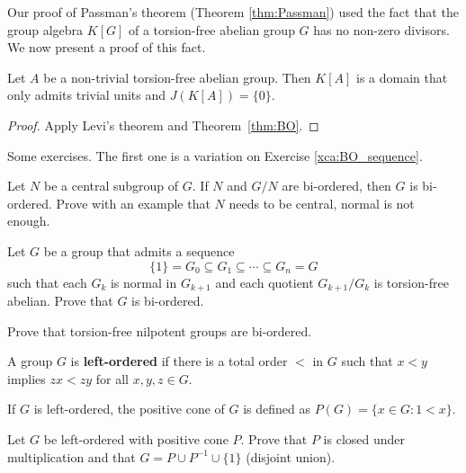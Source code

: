 Our proof of Passman's theorem (Theorem \ref{thm:Passman}) 
used the fact that the group algebra $K[G]$ of
a torsion-free abelian group $G$ has no non-zero divisors. 
We now present a proof of this fact. 

\begin{corollary}
\label{cor:domain_G_abelian}
	Let $A$ be a non-trivial torsion-free abelian group. Then $K[A]$ 
	is a domain that only admits trivial units and $J(K[A])=\{0\}$. 
\end{corollary}

\begin{proof}
	Apply Levi's theorem and Theorem~\ref{thm:BO}.
\end{proof}

Some exercises. The first one is a variation on Exercise \ref{xca:BO_sequence}.

\begin{exercise}
    Let $N$ be a central subgroup of $G$. If $N$ and $G/N$ are bi-ordered, 
    then $G$ is bi-ordered. Prove with an example that $N$ needs to be central, normal 
    is not enough. 
\end{exercise}

\begin{exercise}
    Let $G$ be a group that admits 
    a sequence 
    \[
    \{1\}=G_0\subseteq G_1\subseteq\cdots\subseteq G_n=G
    \]
    such that
    each $G_k$ is normal in $G_{k+1}$ and each quotient $G_{k+1}/G_k$ is 
    torsion-free abelian. Prove that $G$ is bi-ordered.  
\end{exercise}

\begin{exercise}
    Prove that torsion-free nilpotent groups are bi-ordered. 
\end{exercise}



\begin{definition}
	A group $G$ is \textbf{left-ordered} if there is a total order 
	$<$ in $G$ such that $x<y$ implies $zx<zy$ for all $x,y,z\in G$.
\end{definition}

If $G$ is left-ordered, the positive cone of $G$ is defined as $P(G)=\{x\in G:1<x\}$. 

\begin{exercise}
	Let $G$ be left-ordered with positive cone $P$. Prove that 
	$P$ is closed under multiplication and that 
	$G=P\cup P^{-1}\cup \{1\}$ (disjoint union).
\end{exercise}

